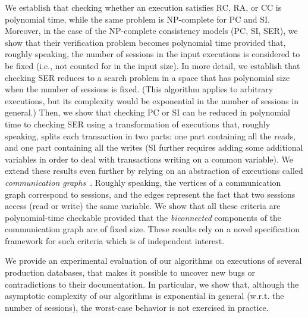 We establish that checking whether an execution satisfies RC, RA, or CC is polynomial time, while the same problem is NP-complete for PC and SI. Moreover, in the case of the NP-complete consistency models (PC, SI, SER), we show that their verification problem becomes polynomial time provided that, roughly speaking, the number of sessions in the input executions is considered to be fixed (i.e., not counted for in the input size). In more detail, we establish that checking SER reduces to a search problem in a space that has polynomial size when the number of sessions is fixed. (This algorithm applies to arbitrary executions, but its complexity would be exponential in the number of sessions in general.) Then, we show that checking PC or SI can be reduced in polynomial time to checking SER using a transformation of executions that, roughly speaking, splits each transaction in two parts: one part containing all the reads, and one part containing all the writes (SI further requires adding some additional variables in order to deal with transactions writing on a common variable).
We extend these results even further by relying on an abstraction of executions called \emph{communication graphs}~\cite{DBLP:journals/pacmpl/ChalupaCPSV18}. Roughly speaking, the vertices of a communication graph correspond to sessions, and the edges represent the fact that two sessions access (read or write) the same variable. We show that all these criteria are polynomial-time checkable provided that the \emph{biconnected} components of the communication graph are of fixed size. These results rely on a novel specification framework for such criteria which is of independent interest.

We provide an experimental evaluation of our algorithms on executions of several production databases, that makes it possible to uncover new bugs or contradictions to their documentation. 
In particular, we show that, although the asymptotic complexity of our algorithms is exponential in general (w.r.t. the number of sessions), the worst-case behavior is not exercised in practice.

